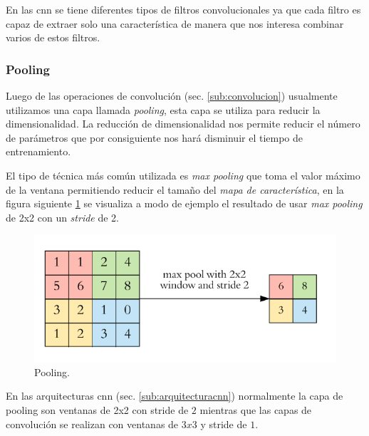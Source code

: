En las \ac{cnn} se tiene diferentes tipos de filtros convolucionales ya que cada filtro es capaz de extraer solo una característica de manera que nos interesa  combinar varios de estos filtros.

\subsubsection{Pooling}\label{sub:pooling}

Luego de las operaciones de convolución (sec. \ref{sub:convolucion}) usualmente utilizamos una capa llamada \textit{pooling}, esta capa se utiliza para reducir la dimensionalidad. La reducción de dimensionalidad nos permite reducir el número de parámetros que por consiguiente nos hará disminuir el tiempo de entrenamiento.

El tipo de técnica más común utilizada es \textit{max pooling} que toma el valor máximo de la ventana permitiendo reducir el tamaño del \textit{mapa de característica}, en la figura siguiente \ref{Fig:Pooling} se visualiza a modo de ejemplo el resultado de usar \textit{max pooling} de 2x2 con un \textit{stride} de 2.

\begin{figure}[H]
 \centering
  \includegraphics[scale=0.4,keepaspectratio=true,clip=true]{imagenes/MarcoTeorico/pooling_1.png}
  \caption{Pooling.} \label{Fig:Pooling}%
\end{figure}

En las arquitecturas \ac{cnn} (sec. \ref{sub:arquitecturacnn}) normalmente la capa de pooling son ventanas de 2x2 con stride de $2$ mientras que las capas de  convolución se realizan con ventanas de $3x3$ y stride de $1$. 

